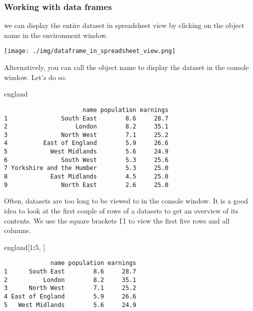 \documentclass[]{article}
\newenvironment{Shaded}{\begin{snugshade}}{\end{snugshade}}
\newcommand{\DecValTok}[1]{\textcolor[rgb]{0.00,0.00,0.81}{#1}}
\newcommand{\NormalTok}[1]{#1}
\newcommand{\OperatorTok}[1]{\textcolor[rgb]{0.81,0.36,0.00}{\textbf{#1}}}
\begin{document}
\hypertarget{working-with-data-frames}{%
\subsubsection{Working with data frames}\label{working-with-data-frames}}

we can display the entire dataset in spreadsheet view by clicking on the object name in the environment window.

\texttt{[image: ./img/dataframe\_in\_spreadsheet\_view.png]}

Alternatively, you can call the object name to display the dataset in the console window. Let's do so:

\begin{Shaded}
\begin{Highlighting}[]
\NormalTok{england}
\end{Highlighting}
\end{Shaded}

\begin{verbatim}
                      name population earnings
1               South East        8.6     28.7
2                   London        8.2     35.1
3               North West        7.1     25.2
4          East of England        5.9     26.6
5            West Midlands        5.6     24.9
6               South West        5.3     25.6
7 Yorkshire and the Humber        5.3     25.0
8            East Midlands        4.5     25.0
9               North East        2.6     25.0
\end{verbatim}

Often, datasets are too long to be viewed to in the console window. It is a good idea to look at the first couple of rows of a datasets to get an overview of its contents. We use the square brackets \texttt{{[}{]}} to view the first five rows and all columns.

\begin{Shaded}
\begin{Highlighting}[]
\NormalTok{england[}\DecValTok{1}\OperatorTok{:}\DecValTok{5}\NormalTok{, ]}
\end{Highlighting}
\end{Shaded}

\begin{verbatim}
             name population earnings
1      South East        8.6     28.7
2          London        8.2     35.1
3      North West        7.1     25.2
4 East of England        5.9     26.6
5   West Midlands        5.6     24.9
\end{verbatim}
\end{document}
